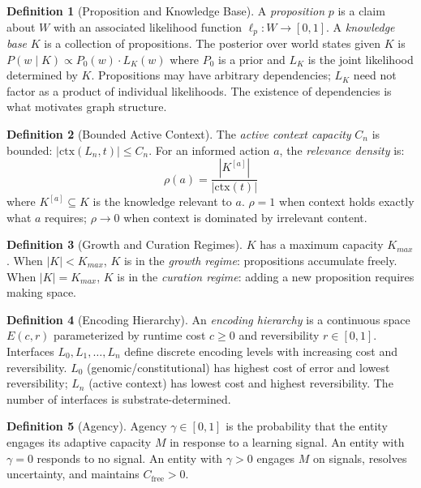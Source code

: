 \documentclass[11pt]{article}
\theoremstyle{definition}
\newtheorem{definition}{Definition}
\theoremstyle{remark}
\begin{document}
\begin{definition}[Proposition and Knowledge Base]
\label{def:knowledge}
A \emph{proposition} $p$ is a claim about $W$ with an associated
likelihood function $\ell_p : W \to [0,1]$. A \emph{knowledge base} $K$
is a collection of propositions. The posterior over world states given
$K$ is $P(w \mid K) \propto P_0(w) \cdot L_K(w)$
where $P_0$ is a prior and $L_K$ is the joint likelihood determined by
$K$. Propositions may have arbitrary dependencies; $L_K$ need
not factor as a product of individual likelihoods. The existence of
dependencies is what motivates graph structure.
\end{definition}

\begin{definition}[Bounded Active Context]
\label{def:context}
The \emph{active context capacity} $C_n$ is bounded: $|\mathrm{ctx}(L_n,
t)| \leq C_n$. For an informed action $a$, the \emph{relevance
density} is:
\[
\rho(a) = \frac{|K^{[a]}|}{|\mathrm{ctx}(t)|}
\]
where $K^{[a]} \subseteq K$ is the knowledge relevant to $a$.
$\rho = 1$ when context holds exactly what $a$ requires;
$\rho \to 0$ when context is dominated by irrelevant content.
\end{definition}

\begin{definition}[Growth and Curation Regimes]
\label{def:regimes}
$K$ has a maximum capacity $K_{max}$. When $|K| < K_{max}$, $K$ is in
the \emph{growth regime}: propositions accumulate freely. When
$|K| = K_{max}$, $K$ is in the \emph{curation regime}: adding a new
proposition requires making space.
\end{definition}

\begin{definition}[Encoding Hierarchy]
\label{def:hierarchy}
An \emph{encoding hierarchy} is a continuous space $E(c,r)$
parameterized by runtime cost $c \geq 0$ and reversibility
$r \in [0,1]$. Interfaces $L_0, L_1, \ldots, L_n$ define discrete
encoding levels with increasing cost and reversibility. $L_0$
(genomic/constitutional) has highest cost of error and lowest
reversibility; $L_n$ (active context) has lowest cost and highest
reversibility. The number of interfaces is substrate-determined.
\end{definition}

\begin{definition}[Agency]
\label{def:agency}
Agency $\gamma \in [0, 1]$ is the probability that the entity engages its
adaptive capacity $M$ in response to a learning signal. An entity with
$\gamma = 0$ responds to no signal. An entity with $\gamma > 0$
engages $M$ on signals, resolves uncertainty, and maintains
$C_{\mathrm{free}} > 0$.
\end{definition}
\end{document}
